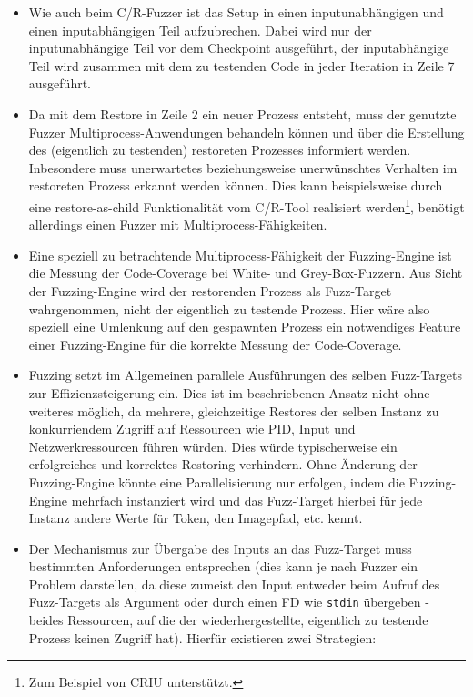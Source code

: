 \documentclass[a4paper]{article}
\begin{document}
\begin{itemize}
    \item Wie auch beim C/R-Fuzzer ist das Setup in einen inputunabhängigen und einen inputabhängigen Teil aufzubrechen. Dabei wird nur der inputunabhängige Teil vor dem Checkpoint ausgeführt, der inputabhängige Teil wird zusammen mit dem zu testenden Code in jeder Iteration in Zeile 7 ausgeführt.
    \item Da mit dem Restore in Zeile 2 ein neuer Prozess entsteht, muss der genutzte Fuzzer Multiprocess-Anwendungen behandeln können und über die Erstellung des (eigentlich zu testenden) restoreten Prozesses informiert werden. 
        Inbesondere muss unerwartetes beziehungsweise unerwünschtes Verhalten im restoreten Prozess erkannt werden können. 
        Dies kann beispielsweise durch eine restore-as-child Funktionalität vom C/R-Tool realisiert werden\footnote{Zum Beispiel von CRIU unterstützt.}, benötigt allerdings einen Fuzzer mit Multiprocess-Fähigkeiten.
    \item Eine speziell zu betrachtende Multiprocess-Fähigkeit der Fuzzing-Engine ist die Messung der Code-Coverage bei White- und Grey-Box-Fuzzern. Aus Sicht der Fuzzing-Engine wird der restorenden Prozess als Fuzz-Target wahrgenommen, nicht der eigentlich zu testende Prozess. Hier wäre also speziell eine Umlenkung auf den gespawnten Prozess ein notwendiges Feature einer Fuzzing-Engine für die korrekte Messung der Code-Coverage.
    \item Fuzzing setzt im Allgemeinen parallele Ausführungen des selben Fuzz-Targets zur Effizienzsteigerung ein. 
        Dies ist im beschriebenen Ansatz nicht ohne weiteres möglich, da mehrere, gleichzeitige Restores der selben Instanz zu konkurriendem Zugriff auf Ressourcen wie PID, Input und Netzwerkressourcen führen würden. Dies würde typischerweise ein erfolgreiches und korrektes Restoring verhindern. 
        Ohne Änderung der Fuzzing-Engine könnte eine Parallelisierung nur erfolgen, indem die Fuzzing-Engine mehrfach instanziert wird und das Fuzz-Target hierbei für jede Instanz andere Werte für Token, den Imagepfad, etc. kennt.
    \item Der Mechanismus zur Übergabe des Inputs an das Fuzz-Target muss bestimmten Anforderungen entsprechen (dies kann je nach Fuzzer ein Problem darstellen, da diese zumeist den Input entweder beim Aufruf des Fuzz-Targets als Argument oder durch einen FD wie \texttt{stdin} übergeben - beides Ressourcen, auf die der wiederhergestellte, eigentlich zu testende Prozess keinen Zugriff hat). Hierfür existieren zwei Strategien:

\end{itemize}
\end{document}
